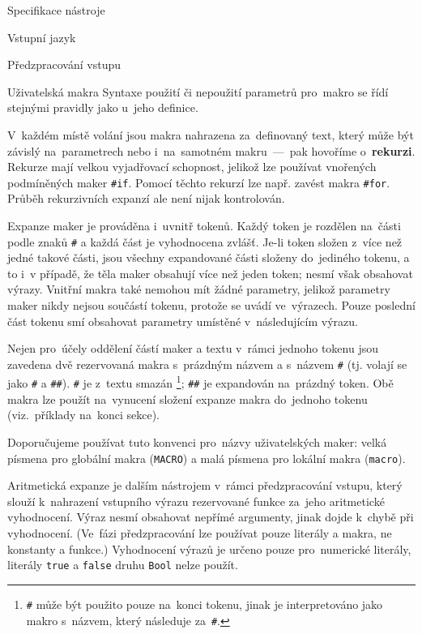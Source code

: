 \documentclass[thesis=M,czech]{FITthesis}[2012/06/26]
\newcommand{\cmt}[1]{\textit{/* #1 */}}
\newcommand{\id}[1]{\texttt{#1}}
\newcommand{\hll}[1]{\textbf{#1}}
\begin{document}
\begin{section}{Specifikace nástroje}
\begin{subsection}{Vstupní jazyk}
\begin{subsubsection}{Předzpracování vstupu}
\begin{paragraph}{Uživatelská makra}
Syntaxe použití či nepoužití parametrů pro~makro
se řídí stejnými pravidly
jako u~jeho definice.

V~každém místě volání jsou makra nahrazena za~definovaný text,
který může být závislý na~parametrech
nebo i~na~samotném makru~---~pak hovoříme o~\hll{rekurzi}.
Rekurze mají velkou vyjadřovací schopnost,
jelikož lze používat vnořených podmíněných maker \id{\#if}.
Pomocí těchto rekurzí lze např. zavést
makra \id{\#for}.
Průběh rekurzivních expanzí ale není nijak kontrolován.

Expanze maker je prováděna i~uvnitř tokenů.
Každý token je rozdělen na~části
podle znaků \id{\#}
a každá část je vyhodnocena zvlášť.
Je-li token složen z~více než jedné takové části,
jsou všechny expandované části složeny do~jediného tokenu,
a to i~v případě, že těla maker obsahují více než jeden token;
nesmí však obsahovat výrazy.
Vnitřní makra také nemohou mít žádné parametry,
jelikož parametry maker nikdy nejsou součástí tokenu,
protože se uvádí ve~výrazech.
Pouze poslední část tokenu smí obsahovat parametry
umístěné v~následujícím výrazu.

Nejen pro~účely oddělení částí maker a textu v~rámci jednoho tokenu
jsou zavedena dvě rezervovaná makra s~prázdným názvem
a s~názvem \id{\#}
(tj. volají se jako \id{\#} a \id{\#\#}).
\id{\#} je z~textu smazán%
\footnote{\id{\#} může být použito pouze na~konci tokenu,
jinak je interpretováno jako makro s~názvem,
který následuje za~\id{\#}.};
\id{\#\#} je expandován na~prázdný token.
Obě makra lze použít na~vynucení složení expanze makra do~jednoho tokenu
(viz.~příklady na~konci sekce).


Doporučujeme používat tuto konvenci pro~názvy uživatelských maker:
velká písmena pro globální makra (\id{MACRO})
a malá písmena pro lokální makra (\id{macro}).
\end{paragraph} %


\begin{paragraph}{Aritmetická expanze}\label{p:design:spec:ilang:macros:arith}
je dalším nástrojem v~rámci předzpracování vstupu,
který slouží k~nahrazení vstupního výrazu rezervované funkce
za~jeho aritmetické vyhodnocení.
Výraz nesmí obsahovat nepřímé argumenty,
jinak dojde k~chybě při vyhodnocení.
(Ve~fázi předzpracování lze používat pouze literály a makra,
ne konstanty a funkce.)
Vyhodnocení výrazů je určeno pouze pro~numerické literály,
literály \id{true} a \id{false} druhu \id{Bool} nelze použít.


\end{paragraph}
\end{subsubsection}
\end{subsection}
\end{section}
\end{document}
